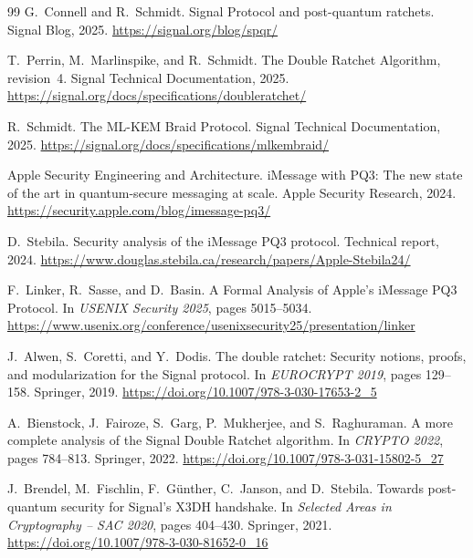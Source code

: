 \documentclass[preprint,12pt]{elsarticle}
\theoremstyle{definition}
\begin{document}
\begin{thebibliography}{99}
G.~Connell and R.~Schmidt.
\newblock Signal Protocol and post-quantum ratchets.
\newblock Signal Blog, 2025.
\newblock \url{https://signal.org/blog/spqr/}

T.~Perrin, M.~Marlinspike, and R.~Schmidt.
\newblock The Double Ratchet Algorithm, revision~4.
\newblock Signal Technical Documentation, 2025.
\newblock \url{https://signal.org/docs/specifications/doubleratchet/}

R.~Schmidt.
\newblock The ML-KEM Braid Protocol.
\newblock Signal Technical Documentation, 2025.
\newblock \url{https://signal.org/docs/specifications/mlkembraid/}

Apple Security Engineering and Architecture.
\newblock iMessage with {PQ3}: The new state of the art in quantum-secure
messaging at scale.
\newblock Apple Security Research, 2024.
\newblock \url{https://security.apple.com/blog/imessage-pq3/}

D.~Stebila.
\newblock Security analysis of the iMessage {PQ3} protocol.
\newblock Technical report, 2024.
\newblock \url{https://www.douglas.stebila.ca/research/papers/Apple-Stebila24/}

F.~Linker, R.~Sasse, and D.~Basin.
\newblock A Formal Analysis of Apple's iMessage {PQ3} Protocol.
\newblock In \emph{USENIX Security 2025}, pages 5015--5034.
\newblock \url{https://www.usenix.org/conference/usenixsecurity25/presentation/linker}

J.~Alwen, S.~Coretti, and Y.~Dodis.
\newblock The double ratchet: Security notions, proofs, and modularization for the Signal protocol.
\newblock In \emph{EUROCRYPT 2019}, pages 129--158. Springer, 2019.
\newblock \url{https://doi.org/10.1007/978-3-030-17653-2_5}

A.~Bienstock, J.~Fairoze, S.~Garg, P.~Mukherjee, and S.~Raghuraman.
\newblock A more complete analysis of the Signal Double Ratchet algorithm.
\newblock In \emph{CRYPTO 2022}, pages 784--813. Springer, 2022.
\newblock \url{https://doi.org/10.1007/978-3-031-15802-5_27}

J.~Brendel, M.~Fischlin, F.~G{\"u}nther, C.~Janson, and D.~Stebila.
\newblock Towards post-quantum security for Signal's {X3DH} handshake.
\newblock In \emph{Selected Areas in Cryptography -- SAC 2020}, pages 404--430. Springer, 2021.
\newblock \url{https://doi.org/10.1007/978-3-030-81652-0_16}


\end{thebibliography}
\end{document}
